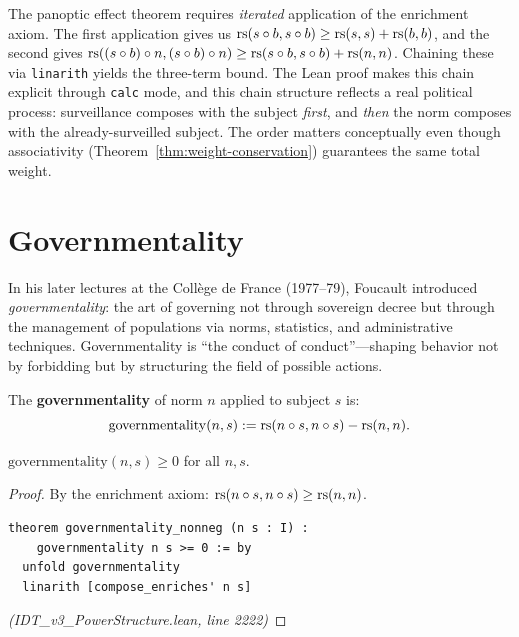 \begin{remark}
The panoptic effect theorem requires \emph{iterated} application of the
enrichment axiom. The first application gives us
$\mathrm{rs}(s \circ b, s \circ b) \geq \mathrm{rs}(s,s) + \mathrm{rs}(b,b)$, and the second gives
$\mathrm{rs}((s \circ b) \circ n, (s \circ b) \circ n) \geq \mathrm{rs}(s \circ b, s \circ b) + \mathrm{rs}(n,n)$.
Chaining these via \texttt{linarith} yields the three-term bound. The Lean proof
makes this chain explicit through \texttt{calc} mode, and this chain structure
reflects a real political process: surveillance composes with the subject
\emph{first}, and \emph{then} the norm composes with the already-surveilled
subject. The order matters conceptually even though associativity
(Theorem~\ref{thm:weight-conservation}) guarantees the same total weight.
\end{remark}

\section{Governmentality}

In his later lectures at the Collège de France (1977--79), Foucault introduced
\emph{governmentality}: the art of governing not through sovereign decree but
through the management of populations via norms, statistics, and administrative
techniques. Governmentality is ``the conduct of conduct''---shaping behavior
not by forbidding but by structuring the field of possible actions.

\begin{definition}[Governmentality]
\label{def:governmentality}
The \textbf{governmentality} of norm $n$ applied to subject $s$ is:
\[
  \mathrm{governmentality}(n, s) := \mathrm{rs}(n \circ s, n \circ s) - \mathrm{rs}(n, n).
\]
\end{definition}

\begin{theorem}
\label{thm:governmentality-nonneg}
$\mathrm{governmentality}(n, s) \geq 0$ for all $n, s$.
\end{theorem}

\begin{proof}
By the enrichment axiom: $\mathrm{rs}(n \circ s, n \circ s) \geq \mathrm{rs}(n,n)$.
\begin{lstlisting}
theorem governmentality_nonneg (n s : I) :
    governmentality n s >= 0 := by
  unfold governmentality
  linarith [compose_enriches' n s]
\end{lstlisting}
\textit{(IDT\_v3\_PowerStructure.lean, line 2222)}
\end{proof}


